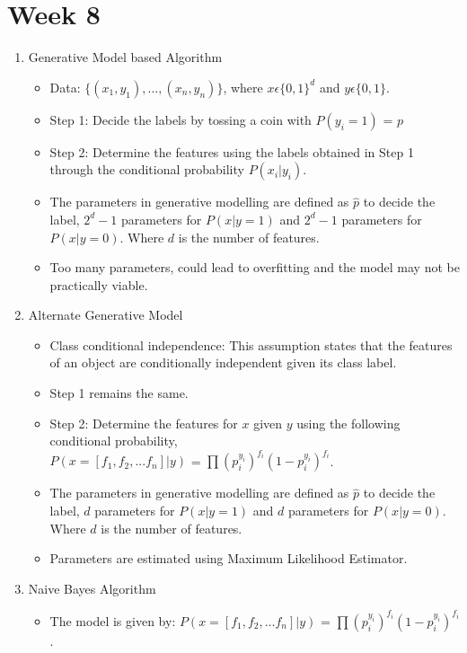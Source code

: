 \documentclass[a4paper]{article}
\begin{document}
\section{Week 8}
\begin{enumerate}
    \item Generative Model based Algorithm
    \begin{itemize}
        \item Data: $\{(x_1,y_1), ..., (x_n,y_n)\}$, where $x\epsilon\{0,1\}^d$ and $y\epsilon\{0,1\}$.
        \item Step 1: Decide the labels by tossing a coin with $P(y_i = 1)$ = $p$
        \item Step 2: Determine the features using the labels obtained in Step 1 through the conditional probability $P(x_i|y_i)$.
        \item The parameters in generative modelling are defined as $\hat{p}$ to decide the label, $2^d-1$ parameters for $P(x|y=1)$ and $2^d-1$ parameters for $P(x|y=0)$. Where $d$ is the number of features.
        \item Too many parameters, could lead to overfitting and the model may not be practically viable.
    \end{itemize}
    \item Alternate Generative Model
    \begin{itemize}
        \item Class conditional independence: This assumption states that the features of an object are conditionally independent given its class label.
        \item Step 1 remains the same.
        \item Step 2: Determine the features for $x$ given $y$ using the following conditional probability,\\
        $P(x=[f_1,f_2,...f_n]|y)$ = $\prod(p_i^{y_i})^{f_i}(1-p_i^{y_i})^{f_i}$.
        \item The parameters in generative modelling are defined as $\hat{p}$ to decide the label, $d$ parameters for $P(x|y=1)$ and $d$ parameters for $P(x|y=0)$. Where $d$ is the number of features.
        \item Parameters are estimated using Maximum Likelihood Estimator.
    \end{itemize}
    \item Naive Bayes Algorithm
    \begin{itemize}
        \item The model is given by: $P(x=[f_1,f_2,...f_n]|y)$ = $\prod(p_i^{y_i})^{f_i}(1-p_i^{y_i})^{f_i}$.

\end{itemize}
\end{enumerate}
\end{document}
